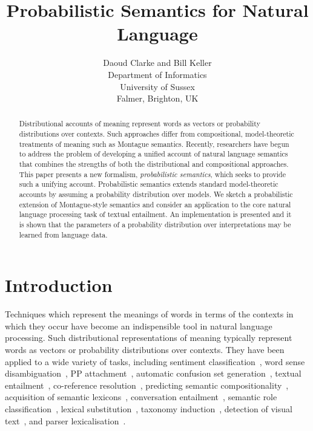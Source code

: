 \documentclass[letterpaper]{article}
\begin{document}
%
\title{Probabilistic Semantics for Natural Language}
\author{Daoud Clarke and Bill Keller\\
Department of Informatics\\
University of Sussex\\
Falmer, Brighton, UK\\
}
\maketitle
\begin{abstract}
Distributional accounts of meaning
represent words as vectors or probability distributions over
contexts. Such approaches differ from compositional, model-theoretic treatments of meaning
such as Montague semantics. Recently, researchers have begun to address the problem of  developing a unified account of natural language semantics that combines the strengths of both the distributional and compositional approaches. This paper presents a new formalism, {\em probabilistic semantics\/}, which seeks to provide such a unifying account. Probabilistic semantics extends standard model-theoretic
accounts by assuming a probability distribution over
models. We sketch a probabilistic extension of Montague-style semantics and consider an application  to the core natural language processing task of textual entailment. An implementation is presented and it is shown that the parameters of a probability distribution over interpretations may be learned from language data.


\end{abstract}


\section{Introduction}

Techniques which represent the meanings of words in terms of the contexts in
which they occur have become an indispensible tool in natural language
processing. Such distributional representations of meaning typically
represent words as vectors or probability distributions over
contexts. They have been applied to a wide variety of tasks,
including sentiment classification~\cite{Bollegala2011}, word sense
disambiguation~\cite{miller-EtAl:2012:PAPERS,khapra-EtAl:2010:ACL}, PP
attachment~\cite{Calvo05distributionalthesaurus}, automatic confusion
set generation~\cite{xue-hwa:2012:PAPERS}, textual
entailment~\cite{berant-dagan-goldberger:2010:ACL}, co-reference
resolution~\cite{lee-EtAl:2012:EMNLP-CoNLL}, predicting semantic
compositionality~\cite{bergsma-EtAl:2010:EMNLP}, acquisition of
semantic lexicons~\cite{mcintosh:2010:EMNLP}, conversation
entailment~\cite{zhang-chai:2010:EMNLP}, semantic role
classification~\cite{zapirain-EtAl:2010:NAACLHLT}, lexical
substitution~\cite{szarvas-biemann-gurevych:2013:NAACL-HLT}, taxonomy
induction~\cite{fountain-lapata:2012:NAACL-HLT}, detection of visual
text~\cite{dodge-EtAl:2012:NAACL-HLT}, and parser
lexicalisation~\cite{rei-briscoe:2013:NAACL-HLT}.
\end{document}
